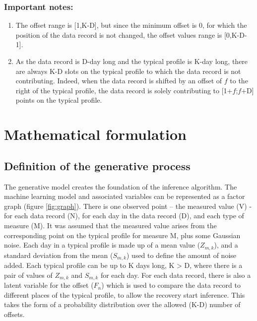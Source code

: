\subsubsection{Important notes:}
\begin{enumerate}
    \item The offset range is [1,K-D], but since the minimum offset is 0, for which the position of the data record is not changed, the offset values range is [0,K-D-1]. 
    \item As the data record is D-day long and the typical profile is K-day long, there are always K-D slots on the typical profile to which the data record is not contributing. Indeed, when the data record is shifted by an offset of $f$ to the right of the typical profile, the data record is solely contributing to [1+$f$;$f$+D] points on the typical profile.  
\end{enumerate}

\section{Mathematical formulation}

\subsection{Definition of the generative process} \label{sec:datagen}
The generative model creates the foundation of the inference algorithm. The machine learning model and associated variables can be represented as a factor graph (figure \ref{fig:graph}). There is one observed point – the measured value (V) - for each data record (N), for each day in the data record (D), and each type of measure (M). It was assumed that the measured value arises from the corresponding point on the typical profile for measure M, plus some Gaussian noise. Each day in a typical profile is made up of a mean value ($Z_{m,k}$), and a standard deviation from the mean ($S_{m,k}$) used to define the amount of noise added. Each typical profile can be up to K days long, K > D, where there is a pair of values of $Z_{m,k}$ and $S_{m,k}$ for each day. For each data record, there is also a latent variable for the offset ($F_n$) which is used to compare the data record to different places of the typical profile, to allow the recovery start inference. This takes the form of a probability distribution over the allowed (K-D) number of offsets.

